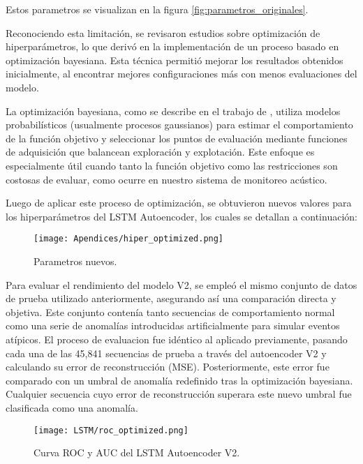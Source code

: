       Estos parametros se visualizan en la figura \ref{fig:parametros_originales}.

      Reconociendo esta limitación, se revisaron estudios sobre optimización de hiperparámetros, lo que derivó en la implementación de un proceso basado en optimización bayesiana. Esta técnica permitió mejorar los resultados obtenidos inicialmente, al encontrar mejores configuraciones más con menos evaluaciones del modelo.

      La optimización bayesiana, como se describe en el trabajo de \citeauthor{gardner2014bayesian} \citeyear{gardner2014bayesian}, utiliza modelos probabilísticos (usualmente procesos gaussianos) para estimar el comportamiento de la función objetivo y seleccionar los puntos de evaluación mediante funciones de adquisición que balancean exploración y explotación. Este enfoque es especialmente útil cuando tanto la función objetivo como las restricciones son costosas de evaluar, como ocurre en nuestro sistema de monitoreo acústico.

      Luego de aplicar este proceso de optimización, se obtuvieron nuevos valores para los hiperparámetros del LSTM Autoencoder, los cuales se detallan a continuación:

      \begin{figure}
            \centering
            \texttt{[image: Apendices/hiper\_optimized.png]}
            \caption{Parametros nuevos.}
            \label{fig:parametros_nuevos}
      \end{figure}


      Para evaluar el rendimiento del modelo  V2, se empleó el mismo conjunto de datos de prueba utilizado anteriormente, asegurando así una comparación directa y objetiva. Este conjunto contenía tanto secuencias de comportamiento normal como una serie de anomalías introducidas artificialmente para simular eventos atípicos.
      El proceso de evaluacion fue idéntico al aplicado previamente, pasando cada una de las 45,841 secuencias de prueba a través del autoencoder V2 y calculando su error de reconstrucción (MSE). Posteriormente, este error fue comparado con un umbral de anomalía redefinido tras la optimización bayesiana. Cualquier secuencia cuyo error de reconstrucción superara este nuevo umbral fue clasificada como una anomalía.
      \begin{figure}[H]
            \centering
            \texttt{[image: LSTM/roc\_optimized.png]}
            \caption{Curva ROC y AUC del LSTM Autoencoder V2.}
            \label{fig:roc_lstm_optimized}
      \end{figure}

